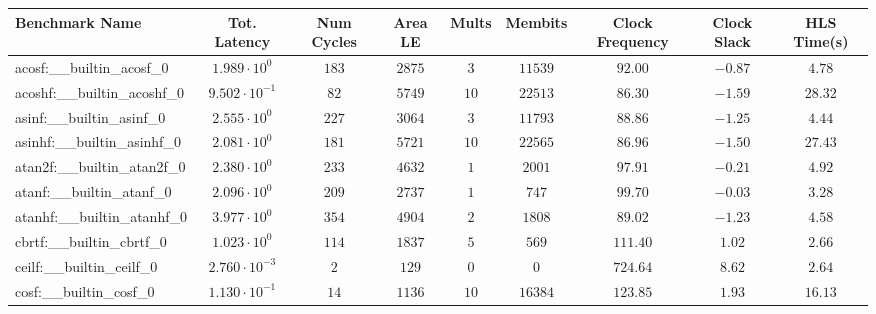 \begin{tabular}{|l|c|c|c|c|c|c|c|c|}
\hline
Benchmark Name                            & Tot. Latency            & Num Cycles & Area LE   & Mults   & Membits    & Clock Frequency & Clock Slack & HLS Time(s) \\
\hline
acosf:\_\_builtin\_acosf\_0               & $ 1.989 \cdot 10^{0}  $ & $ 183    $ & $ 2875  $ & $ 3   $ & $ 11539  $ & $ 92.00       $ & $ -0.87   $ & $ 4.78    $ \\
acoshf:\_\_builtin\_acoshf\_0             & $ 9.502 \cdot 10^{-1} $ & $ 82     $ & $ 5749  $ & $ 10  $ & $ 22513  $ & $ 86.30       $ & $ -1.59   $ & $ 28.32   $ \\
asinf:\_\_builtin\_asinf\_0               & $ 2.555 \cdot 10^{0}  $ & $ 227    $ & $ 3064  $ & $ 3   $ & $ 11793  $ & $ 88.86       $ & $ -1.25   $ & $ 4.44    $ \\
asinhf:\_\_builtin\_asinhf\_0             & $ 2.081 \cdot 10^{0}  $ & $ 181    $ & $ 5721  $ & $ 10  $ & $ 22565  $ & $ 86.96       $ & $ -1.50   $ & $ 27.43   $ \\
atan2f:\_\_builtin\_atan2f\_0             & $ 2.380 \cdot 10^{0}  $ & $ 233    $ & $ 4632  $ & $ 1   $ & $ 2001   $ & $ 97.91       $ & $ -0.21   $ & $ 4.92    $ \\
atanf:\_\_builtin\_atanf\_0               & $ 2.096 \cdot 10^{0}  $ & $ 209    $ & $ 2737  $ & $ 1   $ & $ 747    $ & $ 99.70       $ & $ -0.03   $ & $ 3.28    $ \\
atanhf:\_\_builtin\_atanhf\_0             & $ 3.977 \cdot 10^{0}  $ & $ 354    $ & $ 4904  $ & $ 2   $ & $ 1808   $ & $ 89.02       $ & $ -1.23   $ & $ 4.58    $ \\
cbrtf:\_\_builtin\_cbrtf\_0               & $ 1.023 \cdot 10^{0}  $ & $ 114    $ & $ 1837  $ & $ 5   $ & $ 569    $ & $ 111.40      $ & $ 1.02    $ & $ 2.66    $ \\
ceilf:\_\_builtin\_ceilf\_0               & $ 2.760 \cdot 10^{-3} $ & $ 2      $ & $ 129   $ & $ 0   $ & $ 0      $ & $ 724.64      $ & $ 8.62    $ & $ 2.64    $ \\
cosf:\_\_builtin\_cosf\_0                 & $ 1.130 \cdot 10^{-1} $ & $ 14     $ & $ 1136  $ & $ 10  $ & $ 16384  $ & $ 123.85      $ & $ 1.93    $ & $ 16.13   $ \\

\end{tabular}
